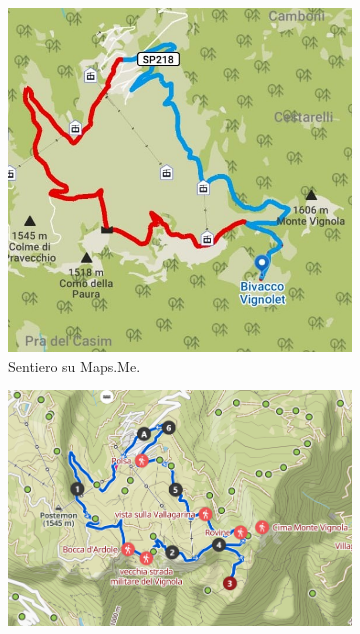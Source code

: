 \documentclass{article}
\begin{document}
\begin{figure}[htbp!]
    \centering
    \begin{subfigure}[t]{0.45\textwidth}
        \centering
        \vspace{0pt} %
        \includegraphics[width=\textwidth]{images/sentiero_mapsMe.jpg}
        \caption{Sentiero su Maps.Me.}
        \label{fig:foto_lunga}
    \end{subfigure}
    \hfill
    \begin{subfigure}[t]{0.45\textwidth}
        \centering
        \vspace{0pt} %
        \includegraphics[width=\textwidth]{images/sentiero_komoot.png}

\end{subfigure}
\end{figure}
\end{document}
